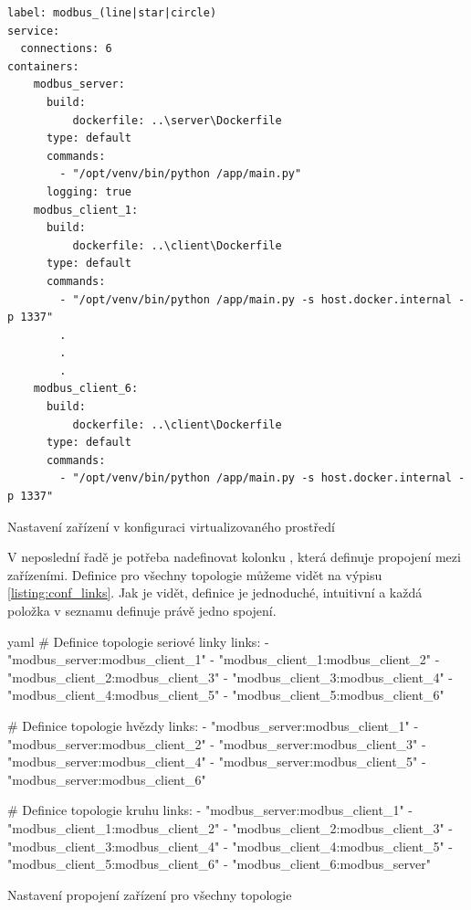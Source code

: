 \begin{listing}[htbp]
    \centering
    \begin{verbatim}
label: modbus_(line|star|circle)
service:
  connections: 6
containers:
    modbus_server:
      build: 
          dockerfile: ..\server\Dockerfile
      type: default
      commands:
        - "/opt/venv/bin/python /app/main.py"
      logging: true
    modbus_client_1:
      build: 
          dockerfile: ..\client\Dockerfile
      type: default
      commands:
        - "/opt/venv/bin/python /app/main.py -s host.docker.internal -p 1337"
        .
        .
        .
    modbus_client_6:
      build: 
          dockerfile: ..\client\Dockerfile
      type: default
      commands:
        - "/opt/venv/bin/python /app/main.py -s host.docker.internal -p 1337"
    \end{verbatim}
\caption{Nastavení zařízení v konfiguraci virtualizovaného prostředí}
\label{listing:conf_devices}
\end{listing}

V neposlední řadě je potřeba nadefinovat kolonku , která definuje propojení mezi zařízeními. Definice pro všechny topologie můžeme vidět na výpisu \ref{listing:conf_links}. Jak je vidět, definice je jednoduché, intuitivní a každá položka v seznamu definuje právě jedno spojení.

\begin{listing}[htbp]
    \centering
    \begin{cminted}[breaklines,autogobble, fontsize=\footnotesize]{yaml}
# Definice topologie seriové linky
links:
- "modbus_server:modbus_client_1"    
- "modbus_client_1:modbus_client_2"    
- "modbus_client_2:modbus_client_3"    
- "modbus_client_3:modbus_client_4"    
- "modbus_client_4:modbus_client_5"    
- "modbus_client_5:modbus_client_6"

# Definice topologie hvězdy
links:
- "modbus_server:modbus_client_1"    
- "modbus_server:modbus_client_2"    
- "modbus_server:modbus_client_3"    
- "modbus_server:modbus_client_4"    
- "modbus_server:modbus_client_5"    
- "modbus_server:modbus_client_6"

# Definice topologie kruhu
links:
- "modbus_server:modbus_client_1"    
- "modbus_client_1:modbus_client_2"    
- "modbus_client_2:modbus_client_3"    
- "modbus_client_3:modbus_client_4"    
- "modbus_client_4:modbus_client_5"    
- "modbus_client_5:modbus_client_6"
- "modbus_client_6:modbus_server"
    \end{cminted}
\caption{Nastavení propojení zařízení pro všechny topologie}
\label{listing:conf_links}
\end{listing}

